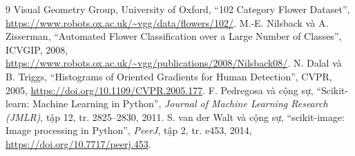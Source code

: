 \clearpage
{}
\begin{thebibliography}{9}
 Visual Geometry Group, University of Oxford, ``102 Category Flower Dataset'', \url{https://www.robots.ox.ac.uk/~vgg/data/flowers/102/}.
 M.-E. Nilsback và A. Zisserman, ``Automated Flower Classification over a Large Number of Classes'', ICVGIP, 2008, \url{https://www.robots.ox.ac.uk/~vgg/publications/2008/Nilsback08/}.
 N. Dalal và B. Triggs, ``Histograms of Oriented Gradients for Human Detection'', CVPR, 2005, \url{https://doi.org/10.1109/CVPR.2005.177}.
 F. Pedregosa và cộng sự, ``Scikit-learn: Machine Learning in Python'', \textit{Journal of Machine Learning Research (JMLR)}, tập 12, tr. 2825--2830, 2011.
 S. van der Walt và cộng sự, ``scikit-image: Image processing in Python'', \textit{PeerJ}, tập 2, tr. e453, 2014, \url{https://doi.org/10.7717/peerj.453}.
\end{thebibliography}
